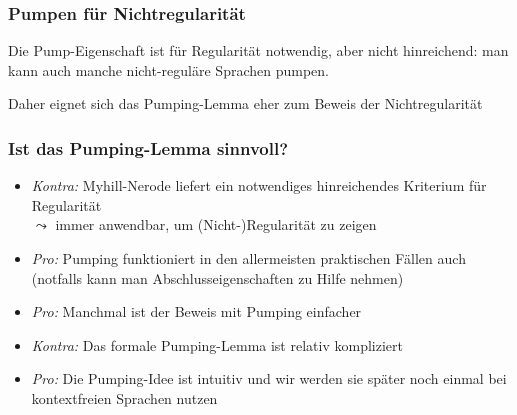 \documentclass[aspectratio=1610,onlymath]{beamer}
\begin{document}
\begin{frame}[t]\frametitle{Pumpen für Nichtregularität}

Die Pump-Eigenschaft ist für Regularität \alert{notwendig}, aber \alert{nicht hinreichend}: man kann auch manche nicht-reguläre Sprachen pumpen.
\medskip

Daher eignet sich das Pumping-Lemma eher zum Beweis der Nichtregularität
\medskip\pause


\end{frame}


\begin{frame}\frametitle{Ist das Pumping-Lemma sinnvoll?}

\begin{itemize}
\item \emph{Kontra:} Myhill-Nerode liefert ein notwendiges  hinreichendes Kriterium für Regularität\\
$\leadsto$ immer anwendbar, um (Nicht-)Regularität zu zeigen
\item \emph{Pro:} Pumping funktioniert in den allermeisten praktischen Fällen auch\\
(notfalls kann man Abschlusseigenschaften zu Hilfe nehmen)
\item \emph{Pro:} Manchmal ist der Beweis mit Pumping einfacher
\item \emph{Kontra:} Das formale Pumping-Lemma ist relativ kompliziert
\item \emph{Pro:} Die Pumping-Idee ist intuitiv und wir werden sie später noch einmal bei kontextfreien Sprachen nutzen
\end{itemize}

\end{frame}


\end{document}
